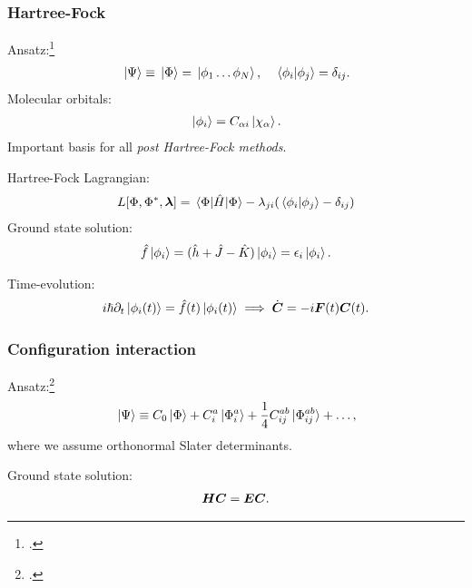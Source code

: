\documentclass{beamer}
\begin{document}
\begin{frame}
    \frametitle{Hartree-Fock}
    Ansatz:\footcite{szabo1996modern}
    \begin{align}
        \ket*{\Psi} \equiv \ket*{\Phi}
        = \ket*{\phi_1 \dots \phi_N},
        \quad
        \braket*{\phi_i}{\phi_j} = \delta_{ij}.
    \end{align}
    Molecular orbitals:
    \begin{align}
        \ket*{\phi_i} = C_{\alpha i}\ket*{\chi_{\alpha}}.
    \end{align}
    Important basis for all \emph{post Hartree-Fock methods}.
\end{frame}

\begin{frame}
    Hartree-Fock Lagrangian:
    \begin{align}
        L[\Phi, \Phi^{*}, \boldsymbol{\lambda}]
        = \mel*{\Phi}{\hat{H}}{\Phi}
        - \lambda_{ji}(\braket*{\phi_i}{\phi_j} - \delta_{ij})
    \end{align}
    Ground state solution:
    \begin{gather}
        \hat{f}\ket*{\phi_i}
        = (\hat{h} + \hat{J} - \hat{K})\ket*{\phi_i}
        = \epsilon_i\ket*{\phi_i}.
    \end{gather}
\end{frame}

\begin{frame}
    Time-evolution:
    \begin{gather}
        i\hslash\partial_t\ket*{\phi_i(t)}
        = \hat{f}(t)\ket*{\phi_i(t)}
        \implies
        \dot{\boldsymbol{C}} = -i\boldsymbol{F}(t)\boldsymbol{C}(t).
    \end{gather}
\end{frame}

\begin{frame}
    \frametitle{Configuration interaction}
    Ansatz:\footcite{helgaker-molecular}
    \begin{align}
        \ket*{\Psi} \equiv C_0\ket*{\Phi}
        + C^{a}_{i}\ket*{\Phi^{a}_{i}}
        + \frac{1}{4}C^{ab}_{ij}\ket*{\Phi^{ab}_{ij}}
        + \dots,
    \end{align}
    where we assume orthonormal Slater determinants.
\end{frame}

\begin{frame}
    Ground state solution:
    \begin{align}
        \boldsymbol{H}\boldsymbol{C} = \boldsymbol{E}\boldsymbol{C}.
    \end{align}
\end{frame}
\end{document}
